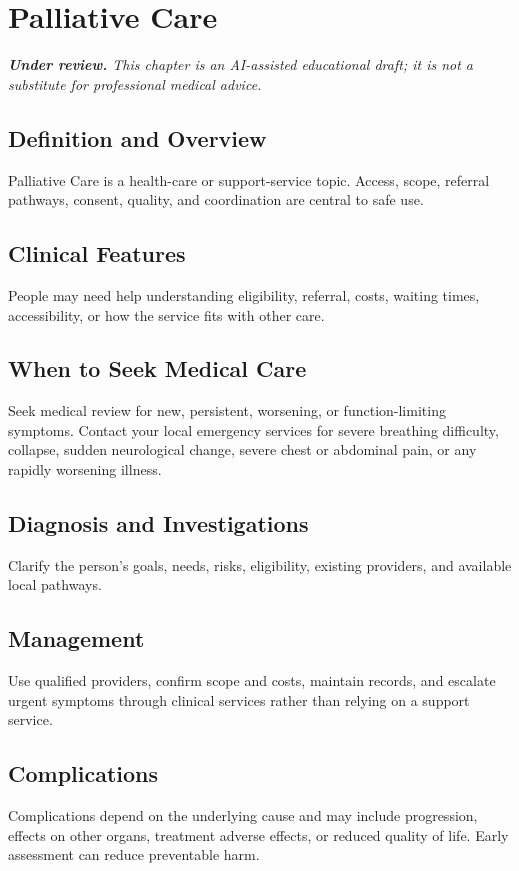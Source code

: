\chapter{Palliative Care}

\medskip
\noindent\textit{\textbf{Under review.} This chapter is an AI-assisted educational draft; it is not a substitute for professional medical advice.}

\section*{Definition and Overview}
Palliative Care is a health-care or support-service topic. Access, scope, referral pathways, consent, quality, and coordination are central to safe use.

\section*{Clinical Features}
People may need help understanding eligibility, referral, costs, waiting times, accessibility, or how the service fits with other care.

\section*{When to Seek Medical Care}
Seek medical review for new, persistent, worsening, or function-limiting symptoms. Contact your local emergency services for severe breathing difficulty, collapse, sudden neurological change, severe chest or abdominal pain, or any rapidly worsening illness.

\section*{Diagnosis and Investigations}
Clarify the person's goals, needs, risks, eligibility, existing providers, and available local pathways.

\section*{Management}
Use qualified providers, confirm scope and costs, maintain records, and escalate urgent symptoms through clinical services rather than relying on a support service.

\section*{Complications}
Complications depend on the underlying cause and may include progression, effects on other organs, treatment adverse effects, or reduced quality of life. Early assessment can reduce preventable harm.

